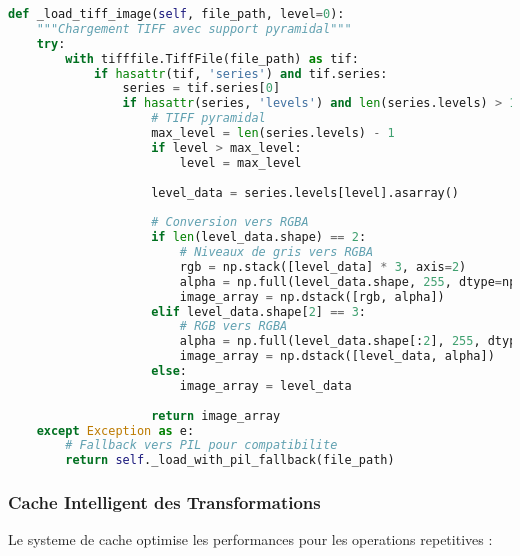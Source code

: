 \documentclass[12pt,a4paper]{article}
\begin{document}
\begin{lstlisting}[language=Python]
def _load_tiff_image(self, file_path, level=0):
    """Chargement TIFF avec support pyramidal"""
    try:
        with tifffile.TiffFile(file_path) as tif:
            if hasattr(tif, 'series') and tif.series:
                series = tif.series[0]
                if hasattr(series, 'levels') and len(series.levels) > 1:
                    # TIFF pyramidal
                    max_level = len(series.levels) - 1
                    if level > max_level:
                        level = max_level
                    
                    level_data = series.levels[level].asarray()
                    
                    # Conversion vers RGBA
                    if len(level_data.shape) == 2:
                        # Niveaux de gris vers RGBA
                        rgb = np.stack([level_data] * 3, axis=2)
                        alpha = np.full(level_data.shape, 255, dtype=np.uint8)
                        image_array = np.dstack([rgb, alpha])
                    elif level_data.shape[2] == 3:
                        # RGB vers RGBA
                        alpha = np.full(level_data.shape[:2], 255, dtype=np.uint8)
                        image_array = np.dstack([level_data, alpha])
                    else:
                        image_array = level_data
                    
                    return image_array
    except Exception as e:
        # Fallback vers PIL pour compatibilite
        return self._load_with_pil_fallback(file_path)
\end{lstlisting}

\subsubsection{Cache Intelligent des Transformations}

Le systeme de cache optimise les performances pour les operations repetitives :
\end{document}
